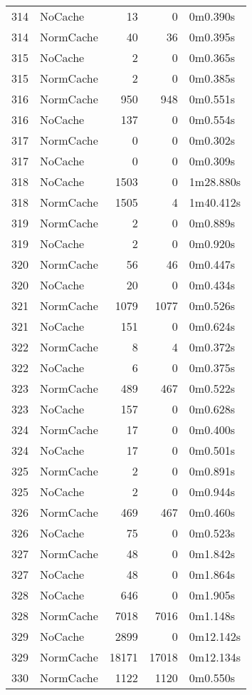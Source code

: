 \begin{tabular}{llrrl}
314 & NoCache & 13 & 0 & 0m0.390s \\
314 & NormCache & 40 & 36 & 0m0.395s \\
315 & NoCache & 2 & 0 & 0m0.365s \\
315 & NormCache & 2 & 0 & 0m0.385s \\
316 & NormCache & 950 & 948 & 0m0.551s \\
316 & NoCache & 137 & 0 & 0m0.554s \\
317 & NormCache & 0 & 0 & 0m0.302s \\
317 & NoCache & 0 & 0 & 0m0.309s \\
318 & NoCache & 1503 & 0 & 1m28.880s \\
318 & NormCache & 1505 & 4 & 1m40.412s \\
319 & NormCache & 2 & 0 & 0m0.889s \\
319 & NoCache & 2 & 0 & 0m0.920s \\
320 & NormCache & 56 & 46 & 0m0.447s \\
320 & NoCache & 20 & 0 & 0m0.434s \\
321 & NormCache & 1079 & 1077 & 0m0.526s \\
321 & NoCache & 151 & 0 & 0m0.624s \\
322 & NormCache & 8 & 4 & 0m0.372s \\
322 & NoCache & 6 & 0 & 0m0.375s \\
323 & NormCache & 489 & 467 & 0m0.522s \\
323 & NoCache & 157 & 0 & 0m0.628s \\
324 & NormCache & 17 & 0 & 0m0.400s \\
324 & NoCache & 17 & 0 & 0m0.501s \\
325 & NormCache & 2 & 0 & 0m0.891s \\
325 & NoCache & 2 & 0 & 0m0.944s \\
326 & NormCache & 469 & 467 & 0m0.460s \\
326 & NoCache & 75 & 0 & 0m0.523s \\
327 & NormCache & 48 & 0 & 0m1.842s \\
327 & NoCache & 48 & 0 & 0m1.864s \\
328 & NoCache & 646 & 0 & 0m1.905s \\
328 & NormCache & 7018 & 7016 & 0m1.148s \\
329 & NoCache & 2899 & 0 & 0m12.142s \\
329 & NormCache & 18171 & 17018 & 0m12.134s \\
330 & NormCache & 1122 & 1120 & 0m0.550s \\

\end{tabular}
